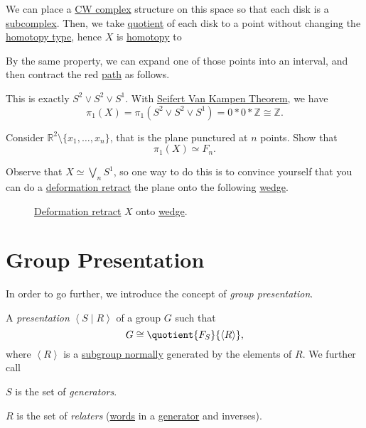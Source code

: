 \begin{explanation}
	We can place a \hyperref[def:CW-Complex]{CW complex} structure on this
	space so that each disk is a \hyperref[def:CW-subcomplex]{subcomplex}. Then, we take \hyperref[CW-complex-quotient]{quotient} of each disk
	to a point without changing the \hyperref[def:homotopy-type]{homotopy type}, hence \(X\) is \hyperref[def:homotopy]{homotopy} to
	\begin{figure}[H]
		\centering
		\label{fig:lec11:eg-3:2}
	\end{figure}
	By the same property, we can expand one of those points into an interval, and then contract the red \hyperref[def:path]{path} as follows.
	\begin{figure}[H]
		\centering
		\label{fig:lec11:eg-3:3}
	\end{figure}
	This is exactly \(S^{2} \vee S^{2} \vee S^1\). With \hyperref[thm:Seifert-Van-Kampen-Theorem]{Seifert Van Kampen Theorem}, we have
	\[
		\pi _1(X) = \pi _1(S^{2} \vee S^{2} \vee S^1) = 0\ast 0\ast \mathbb{Z} \cong \mathbb{Z}.
	\]
\end{explanation}
\begin{exercise}
	Consider \(\mathbb{R} ^2 \setminus \{x_1, \dots , x_n \}\), that is the plane punctured at \(n\) points. Show that
	\[
		\pi _1(X)\simeq F_n.
	\]
\end{exercise}
\begin{answer}
	Observe that \(X \simeq \bigvee_n S^1\), so one way to do this is to convince yourself that you can do a
	\hyperref[def:deformation-retraction]{deformation retract} the plane onto the following \hyperref[CW-complex-wedge-sum]{wedge}.
	\begin{figure}[H]
		\centering
		\caption{\hyperref[def:deformation-retraction]{Deformation retract} \(X\) onto \hyperref[CW-complex-wedge-sum]{wedge}.}
		\label{fig:lec11:ex}
	\end{figure}
\end{answer}

\section{Group Presentation}
In order to go further, we introduce the concept of \emph{group presentation}.
\begin{definition}\label{def:group-presentation}
	A \emph{presentation} \(\left< S \mid R \right> \) of a group \(G\) such that
	\[
		G\cong \quotient{F_S}{\left< R \right>},
	\]
	where \(\left< R \right> \) is a \hyperref[def:normal-subgroup]{subgroup normally} generated by the elements of \(R\). We further call
	\begin{definition}[Generator]\label{def:generator}
		\(S\) is the set of \emph{generators}.
	\end{definition}
	\begin{definition}[Relater]\label{def:relater}
		\(R\) is the set of \emph{relaters} (\hyperref[def:word]{words} in a \hyperref[def:generator]{generator} and inverses).
	\end{definition}
\end{definition}

